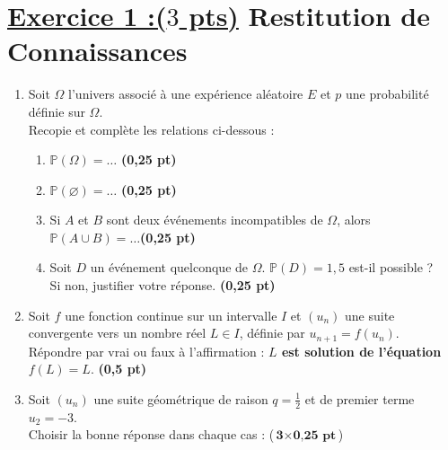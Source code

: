 \documentclass[12pt,a4paper]{article}
\begin{document}
\section*{\underline{Exercice 1 :($3$ pts)} Restitution de Connaissances}
\begin{enumerate}
    \item Soit \( \Omega \) l’univers associé à une expérience aléatoire \( E \) et \( p \) une probabilité définie sur \( \Omega \).\\
    Recopie et complète les relations ci-dessous :
    \begin{enumerate}
        \item \( \mathbb{P}(\Omega) = \ldots \) \hfill \textbf{(0,25 pt)}
        \item \( \mathbb{P}(\varnothing) = \ldots \) \hfill \textbf{(0,25 pt)}
        \item Si \( A \) et \( B \) sont deux événements incompatibles de \( \Omega \), alors \( \mathbb{P}(A \cup B) = \ldots \)\hfill \textbf{(0,25 pt)}
        \item Soit \( D \) un événement quelconque de \( \Omega \). \( \mathbb{P}(D) = 1{,}5 \) est-il possible ?\\
        Si non, justifier votre réponse. \hfill \textbf{(0,25 pt)}
    \end{enumerate}
    
    \item Soit \( f \) une fonction continue sur un intervalle \( I \) et \( (u_n) \) une suite convergente vers un nombre réel \( L \in I \), définie par \( u_{n+1} = f(u_n) \).\\
    Répondre par vrai ou faux à l’affirmation : \textbf{\( L \) est solution de l’équation \( f(L) = L \)}. \hfill \textbf{(0,5 pt)}
    
    \item Soit \( (u_n) \) une suite géométrique de raison \( q = \frac{1}{2} \) et de premier terme \( u_2 = -3 \).\\
    Choisir la bonne réponse dans chaque cas : \hfill (\( \textbf{3} \times \textbf{0,25 pt} \))


\end{enumerate}
\end{document}

